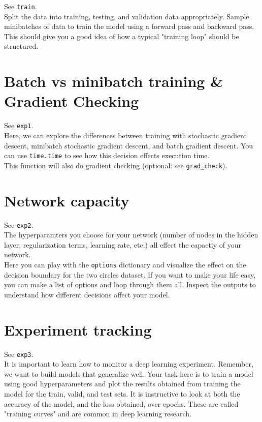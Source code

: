 \documentclass[reqno]{amsart}
\theoremstyle{definition}
\theoremstyle{remark}
\numberwithin{equation}{section}
\begin{document}
See \texttt{train}. \\

Split the data into training, testing, and validation data appropriately. Sample
minibatches of data to train the model using a forward pass and backward pass. \\

This should give you a good idea of how a typical "training loop" should be
structured.

\section{Batch vs minibatch training \& Gradient Checking}

See \texttt{exp1}. \\

Here, we can explore the differences between training with stochastic gradient
descent, minibatch stochastic gradient descent, and batch gradient descent.
You can use \texttt{time.time\(\)} to see how this decision effects execution
time. \\

This function will also do gradient checking (optional:
see \texttt{grad\_check}).

\section{Network capacity}

See \texttt{exp2}. \\

The hyperparamters you choose for your network (number of nodes in the hidden
layer, regularization terms, learning rate, etc.) all effect the capactiy
of your network. \\

Here you can play with the \texttt{options} dictionary and visualize the effect
on the decision boundary for the two circles dataset. If you want to make your
life easy, you can make a list of options and loop through them all. Inspect the
outputs to understand how different decisions affect your model.

\section{Experiment tracking}

See \texttt{exp3}. \\

It is important to learn how to monitor a deep learning experiment. Remember,
we want to build models that generalize well. Your task here is to train a model
using good hyperparameters and plot the results obtained from training the
model for the train, valid, and test sets. It is instructive to look at both
the accuracy of the model, and the loss obtained, over epochs. These are called
"training curves" and are common in deep learning research.
\end{document}
